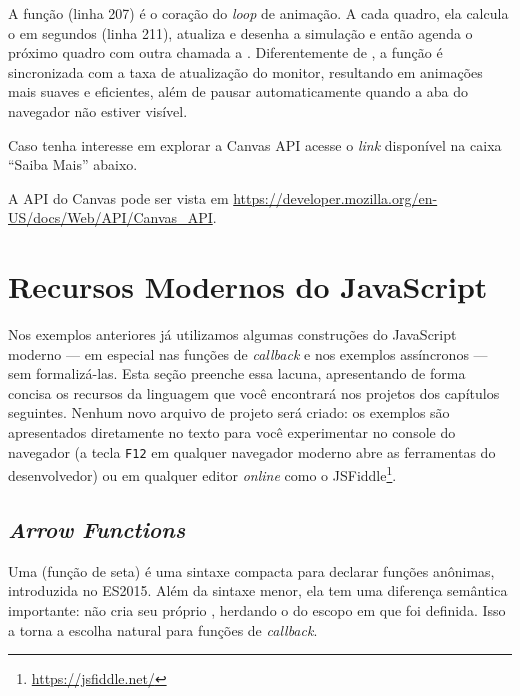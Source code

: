 A função  (linha 207) é o coração do \textit{loop} de animação. A cada quadro, ela calcula o  em segundos (linha 211), atualiza e desenha a simulação e então agenda o próximo quadro com outra chamada a . Diferentemente de , a função  é sincronizada com a taxa de atualização do monitor, resultando em animações mais suaves e eficientes, além de pausar automaticamente quando a aba do navegador não estiver visível.

Caso tenha interesse em explorar a Canvas API acesse o \textit{link} disponível na caixa ``Saiba Mais'' abaixo.

\begin{saibaMais}
    A API do Canvas pode ser vista em \url{https://developer.mozilla.org/en-US/docs/Web/API/Canvas_API}.
\end{saibaMais}



\section{Recursos Modernos do JavaScript}

Nos exemplos anteriores já utilizamos algumas construções do JavaScript moderno --- em especial nas funções de \textit{callback} e nos exemplos assíncronos --- sem formalizá-las. Esta seção preenche essa lacuna, apresentando de forma concisa os recursos da linguagem que você encontrará nos projetos dos capítulos seguintes. Nenhum novo arquivo de projeto será criado: os exemplos são apresentados diretamente no texto para você experimentar no console do navegador (a tecla \texttt{F12} em qualquer navegador moderno abre as ferramentas do desenvolvedor) ou em qualquer editor \textit{online} como o JSFiddle\footnote{\url{https://jsfiddle.net/}}.


\subsection{\textit{Arrow Functions}}

Uma  (função de seta) é uma sintaxe compacta para declarar funções anônimas, introduzida no ES2015. Além da sintaxe menor, ela tem uma diferença semântica importante: não cria seu próprio , herdando o  do escopo em que foi definida. Isso a torna a escolha natural para funções de \textit{callback}.


